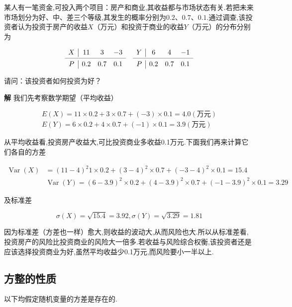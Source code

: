 \begin{example}
	某人有一笔资金,可投入两个项目：房产和商业,其收益都与市场状态有关.若把未来市场划分为好、中、差三个等级,其发生的概率分别为$ 0.2、0.7、0.1 $.通过调查,该投资者认为投资于房产的收益$ X $（万元）和投资于商业的收益$ Y $（万元）的分布分别为
	
	\[
	\begin{array}{c|ccccc|ccc}
	X     & 11    & 3     & -3    &       & Y     & 6     & 4     & -1 \\
	\cmidrule{1-4}\cmidrule{6-9}    P     & 0.2   & 0.7   & 0.1   &       & P     & 0.2   & 0.7   & 0.1 \\
	\end{array}
	\]
	
	请问：该投资者如何投资为好？
	
	\textbf{解} 我们先考察数学期望（平均收益）
	
	\[
	\begin{array}{c}
	{E(X)=11 \times 0.2+3 \times 0.7+(-3) \times 0.1=4.0 (\text{万元})} \\ 
	{E(Y)=6 \times 0.2+4 \times 0.7+(-1) \times 0.1=3.9(\text{万元})}
	\end{array}
	\]
	
	从平均收益看,投资房产收益大,可比投资商业多收益0.1万元.下面我们再来计算它们各自的方差
	
	\[
	\begin{aligned} 
	\operatorname{Var}(X) &=(11-4)^{2} 1 \times 0.2+(3-4)^{2} \times 0.7+(-3-4)^{2} \times 0.1=15.4 \\ 
	& \operatorname{Var}(Y)=(6-3.9)^{2} \times 0.2+(4-3.9)^{2} \times 0.7+(-1-3.9)^{2} \times 0.1=3.29 
	\end{aligned}
	\]
	
	及标准差
	
	\[
	\sigma(X)=\sqrt{15.4}=3.92, \sigma(Y)=\sqrt{3.29}=1.81
	\]
	
	因为标准差（方差也一样）愈大,则收益的波动大,从而风险也大.所以从标准差看,投资房产的风险比投资商业的风险大一倍多.若收益与风险综合权衡,该投资者还是应该选择投资商业为好,虽然平均收益少0.1万元,而风险要小一半以上.
	
\end{example}

\subsection{方整的性质}

以下均假定随机变量的方差是存在的.


